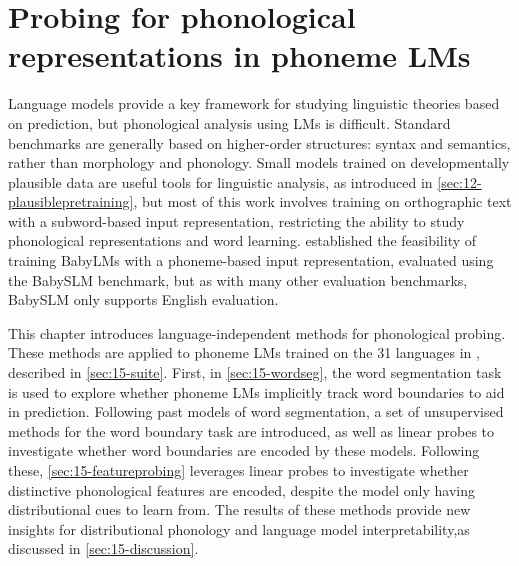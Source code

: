 \chapter{Probing for phonological representations in phoneme LMs}\label{chapter:phonology}

Language models provide a key framework for studying linguistic theories based on prediction, but phonological analysis using LMs is difficult. Standard benchmarks are generally based on higher-order structures: syntax and semantics, rather than morphology and phonology. Small models trained on developmentally plausible data are useful tools for linguistic analysis, as introduced in \cref{sec:12-plausiblepretraining}, but most of this work involves training on orthographic text with a subword-based input representation, restricting the ability to study phonological representations and word learning.  established the feasibility of training BabyLMs with a phoneme-based input representation, evaluated using the BabySLM benchmark, but as with many other evaluation benchmarks, BabySLM only supports English evaluation.

This chapter introduces language-independent methods for phonological probing. These methods are applied to phoneme LMs trained on the 31 languages in \ipachildes, described in \cref{sec:15-suite}. First, in \cref{sec:15-wordseg}, the word segmentation task is used to explore whether phoneme LMs implicitly track word boundaries to aid in prediction. Following past models of word segmentation, a set of unsupervised methods for the word boundary task are introduced, as well as linear probes to investigate whether word boundaries are encoded by these models. Following these, \cref{sec:15-featureprobing} leverages linear probes to investigate whether distinctive phonological features are encoded, despite the model only having distributional cues to learn from. The results of these methods provide new insights for distributional phonology and language model interpretability,as discussed in \cref{sec:15-discussion}.


